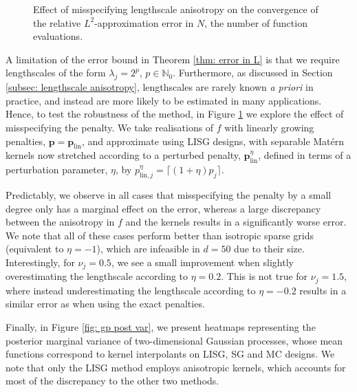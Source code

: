 \documentclass[pdflatex,sn-mathphys-num]{sn-jnl}%
\theoremstyle{thmstyleone}%
\theoremstyle{thmstyletwo}%
\theoremstyle{thmstylethree}%
\begin{document}
\begin{figure}[h]
\begin{subfigure}{.45\textwidth}
    \end{subfigure}
    \caption{Effect of misspecifying lengthscale anisotropy on the convergence of the relative \(L^2\)-approximation error in \(N\), the number of function evaluations.}
    \label{fig: LISG misspecified}
\end{figure}
A limitation of the error bound in Theorem \ref{thm: error in L} is that we require lengthscales of the form \(\lambda_j=2^p\), \(p\in\mathbb{N}_0\). Furthermore, as discussed in Section \ref{subsec: lengthscale anisotropy}, lengthscales are rarely known \emph{a priori} in practice, and instead are more likely to be estimated in many applications. Hence, to test the robustness of the method, in Figure \ref{fig: LISG misspecified} we explore the effect of misspecifying the penalty. We take realisations of \(f\) with linearly growing penalties, \(\mathbf{p}=\mathbf{p}_{\textrm{lin}}\), and approximate using LISG designs, with separable Mat\'ern kernels now stretched according to a perturbed penalty, \(\mathbf{p}^{\eta}_{\textrm{lin}}\), defined in terms of a perturbation parameter, \(\eta\), by \(p_{\textrm{lin},j}^{\eta}=\lceil(1+\eta)p_j\rceil\). 

Predictably, we observe in all cases that misspecifying the penalty by a small degree only has a marginal effect on the error, whereas a large discrepancy between the anisotropy in \(f\) and the kernels results in a significantly worse error. We note that all of these cases perform better than isotropic sparse grids (equivalent to \(\eta=-1\)), which are infeasible in \(d=50\) due to their size. Interestingly, for \(\nu_j=0.5\), we see a small improvement when slightly overestimating the lengthscale according to \(\eta=0.2\). This is not true for \(\nu_j=1.5\), where instead underestimating the lengthscale according to \(\eta=-0.2\) results in a similar error as when using the exact penalties. 

Finally, in Figure \ref{fig: gp post var}, we present heatmaps representing the posterior marginal variance of two-dimensional Gaussian processes, whose mean functions correspond to kernel interpolants on LISG, SG and MC designs. We note that only the LISG method employs anisotropic kernels, which accounts for most of the discrepancy to the other two methods.
\end{document}
